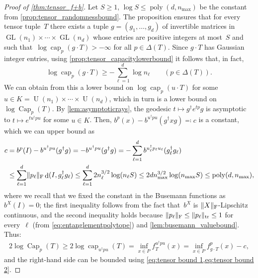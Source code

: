 \documentclass[11pt,letterpaper]{article}
\numberwithin{equation}{section}
\DeclareMathOperator{\poly}{poly}
\DeclareMathOperator{\U}{U}
\DeclareMathOperator{\capacity}{cap}
\DeclareMathOperator{\Capacity}{Cap}
\DeclareMathOperator{\dist}{d}
\DeclareMathOperator{\GL}{GL}
\DeclareMathOperator{\tr}{tr}
\DeclarePairedDelimiter\norm{\lVert}{\rVert}
\begin{document}
\begin{proof}[Proof of \cref{thm:tensor_f+b}]
    Let $S\geq 1$, $\log S \leq \poly(d,n_{\max})$ be the constant from \cref{prop:tensor_randomnessbound}.
    The proposition ensures that for every tensor tuple~$T$ there exists a tuple $g = (g_1, \ldots, g_d)$ of invertible matrices in~$\GL(n_1)\times\cdots\times\GL(n_d)$ whose entries are positive integers at most~$S$ and such that~$\log\capacity_p(g\cdot T) > -\infty$ for all $p \in \Delta(T)$.
    Since $g\cdot T$ has Gaussian integer entries, using \cref{prop:tensor_capacitylowerbound} it follows that, in fact,
    \begin{equation}\label{eq:tensor bound 1}
        \log\capacity_p(g\cdot T) \geq -\sum_{\ell = 1}^d\log n_\ell \qquad (p \in \Delta(T)).
    \end{equation}
    We can obtain from this a lower bound on $\log\capacity_p(u\cdot T)$ for some~$u \in K=\U(n_1)\times\cdots\times\U(n_d)$, which in turn is a lower bound on $\log\Capacity_p(T)$.
    By \cref{lem:asymptoticrays}, the geodesic $t \mapsto g^\dagger e^{tp}g$ is asymptotic to $t \mapsto e^{tu^\dagger pu}$ for some $u \in K$.
    Then, $b^p(x) - b^{u^\dagger pu}(g^\dagger xg) \eqqcolon c$ is a constant, which we can upper bound as
    \begin{align}
    \nonumber
        c
    &= b^p(I) - b^{u^\dagger pu}(g^\dagger g)
    = - b^{u^\dagger pu}(g^\dagger g)
    = - \sum_{\ell=1}^d b^{u_\ell^\dagger p_\ell u_\ell}(g_\ell^\dagger g_\ell) \\
    \label{eq:tensor bound 2}
    &\leq \sum_{\ell=1}^d \norm{p_\ell}_{\mathrm F} \dist(I, g_\ell^\dagger g_\ell)
    \leq \sum_{\ell=1}^d 2 n_\ell^{3/2}\log (n_\ell S)
    \leq 2 d n_{\max}^{3/2}\log (n_{\max} S)
    \leq \poly(d,n_{\max}),
    \end{align}
    where we recall that we fixed the constant in the Busemann functions as~$b^X(I) = 0$; the first inequality follows from the fact that~$b^X$ is $\norm X_{\mathrm{F}}$-Lipschitz continuous, and the second inequality holds because $\norm{p_\ell}_{\mathrm F} \leq \norm{p_\ell}_{\tr} \leq 1$ for every~$\ell$ (from \cref{eq:entanglementpolytope}) and \cref{lem:busemann_valuebound}.
    Thus:
    \begin{align}\label{eq:tensor bound 3}
        2 \log\Capacity_p(T)
    \geq 2 \log\capacity_{u^\dagger p u}(T)
    = \inf_{x \in P} f_T^{u^\dagger p u}(x)
    = \inf_{x \in P} f_{g \cdot T}^p(x) - c,
    \end{align}
    and the right-hand side can be bounded using \cref{eq:tensor bound 1,eq:tensor bound 2}.
\end{proof}
\end{document}
